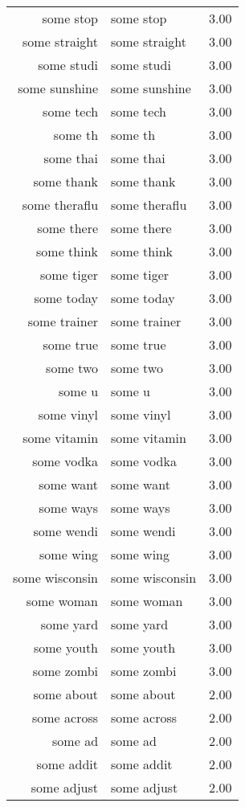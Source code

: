 \begin{table}[ht]
\begin{tabular}{rlr}
  some stop & some stop & 3.00 \\ 
  some straight & some straight & 3.00 \\ 
  some studi & some studi & 3.00 \\ 
  some sunshine & some sunshine & 3.00 \\ 
  some tech & some tech & 3.00 \\ 
  some th & some th & 3.00 \\ 
  some thai & some thai & 3.00 \\ 
  some thank & some thank & 3.00 \\ 
  some theraflu & some theraflu & 3.00 \\ 
  some there & some there & 3.00 \\ 
  some think & some think & 3.00 \\ 
  some tiger & some tiger & 3.00 \\ 
  some today & some today & 3.00 \\ 
  some trainer & some trainer & 3.00 \\ 
  some true & some true & 3.00 \\ 
  some two & some two & 3.00 \\ 
  some u & some u & 3.00 \\ 
  some vinyl & some vinyl & 3.00 \\ 
  some vitamin & some vitamin & 3.00 \\ 
  some vodka & some vodka & 3.00 \\ 
  some want & some want & 3.00 \\ 
  some ways & some ways & 3.00 \\ 
  some wendi & some wendi & 3.00 \\ 
  some wing & some wing & 3.00 \\ 
  some wisconsin & some wisconsin & 3.00 \\ 
  some woman & some woman & 3.00 \\ 
  some yard & some yard & 3.00 \\ 
  some youth & some youth & 3.00 \\ 
  some zombi & some zombi & 3.00 \\ 
  some about & some about & 2.00 \\ 
  some across & some across & 2.00 \\ 
  some ad & some ad & 2.00 \\ 
  some addit & some addit & 2.00 \\ 
  some adjust & some adjust & 2.00 \\ 

\end{tabular}
\end{table}
